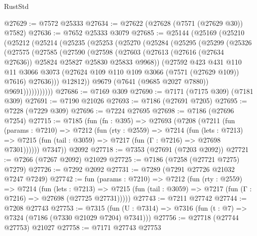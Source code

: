 \begin{lexlean}{RustStd}
\begin{coremodule}
@27629 := @7572 @25333
@27634 := @27622 (@27628 (@7571 (@27629 @30)) @7582)
@27636 := @7652 @25333 @3079
@27685 := @25144
    (@25169
      (@25210
        (@25212
          (@25214
            (@25235
              (@25253
                (@25270
                  (@25284
                    (@25295
                      (@25299
                        (@25326
                          (@27575
                            (@27585
                              (@27590
                                (@27598
                                  (@27603
                                    (@27613
                                      (@27616 (@27634 @27636))
                                      @25824
                                      @25827
                                      @25830
                                      @25833
                                      @9968))
                                  (@27592
                                    @423
                                    @431
                                    @110
                                    @11
                                    @3066
                                    @3073
                                    (@27624 @109 @110 @109 @3066 (@7571 (@27629 @109)) @7616)
                                    @27636)))
                              @12812))
                          @9679
                          (@7641 (@9685 @2027 @7880))
                          @9691)))))))))))
@27686 := @7169 @309
@27690 := @7171 (@7175 @309) (@7181 @309)
@27691 := @7190 @21026
@27693 := @7186 (@27691 @7205)
@27695 := @7228 (@7229 @309)
@27696 := @7224 @27695
@27698 := @7186 (@27696 @7254)
@27715 := @7185
    (fun (fn : @395) =>
    @27693
      (@7208
        (@7211
          (fun (params : @7210) =>
          @7212
            (fun (rty : @2559) =>
            @7214
              (fun (lets : @7213) =>
              @7215 (fun (tail : @3059) => @7217 (fun (Γ : @7216) => @27698 @7301))))))
        @7347))
    @2092
@27718 := @7353 (@27691 (@7203 @2092))
@27721 := @7266 (@7267 @2092) @21029
@27725 := @7186 (@7258 (@27721 @7275) @7279)
@27726 := @7292 @2092
@27731 := @7289 (@7291 @27726 @21032 @7247 @7249)
@27742 := fun (params : @7210) =>
  @7212
    (fun (rty : @2559) =>
    @7214
      (fun (lets : @7213) =>
      @7215 (fun (tail : @3059) => @7217 (fun (Γ : @7216) => @27698 (@27725 @27731)))))
@27743 := @7211 @27742
@27744 := @7208 @27743
@27753 := @7315
    (fun (U : @7314) => @7316 (fun (t : @7) => @7324 (@7186 (@7330 @21029 @7204) @7341)))
@27756 := @27718 (@27744 @27753) @21027
@27758 := @7171 @27743 @27753

\end{coremodule}
\end{lexlean}
